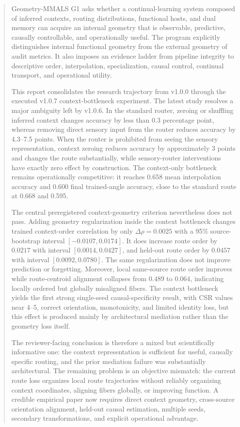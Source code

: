 \documentclass[11pt,a4paper]{article}
\begin{document}
\begin{abstract}
Geometry-MMALS G1 asks whether a continual-learning system composed of inferred contexts, routing distributions, functional hosts, and dual memory can acquire an internal geometry that is observable, predictive, causally controllable, and operationally useful. The program explicitly distinguishes internal functional geometry from the external geometry of audit metrics. It also imposes an evidence ladder from pipeline integrity to descriptive order, interpolation, specialization, causal control, continual transport, and operational utility.

This report consolidates the research trajectory from v1.0.0 through the executed v1.0.7 context-bottleneck experiment. The latest study resolves a major ambiguity left by v1.0.6. In the standard router, zeroing or shuffling inferred context changes accuracy by less than 0.3 percentage point, whereas removing direct sensory input from the router reduces accuracy by 4.3--7.5 points. When the router is prohibited from seeing the sensory representation, context zeroing reduces accuracy by approximately 3 points and changes the route substantially, while sensory-router interventions have exactly zero effect by construction. The context-only bottleneck remains operationally competitive: it reaches 0.658 mean interpolation accuracy and 0.600 final trained-angle accuracy, close to the standard route at 0.668 and 0.595.

The central preregistered context-geometry criterion nevertheless does not pass. Adding geometry regularization inside the context bottleneck changes trained context-order correlation by only $\Delta\rho=0.0025$ with a 95\% source-bootstrap interval $[-0.0107,0.0174]$. It does increase route order by $0.0217$ with interval $[0.0014,0.0427]$, and held-out route order by $0.0457$ with interval $[0.0092,0.0780]$. The same regularization does not improve prediction or forgetting. Moreover, local same-source route order improves while route-centroid alignment collapses from $0.489$ to $0.064$, indicating locally ordered but globally misaligned fibers. The context bottleneck yields the first strong single-seed causal-specificity result, with CSR values near 4--5, correct orientation, monotonicity, and limited identity loss, but this effect is produced mainly by architectural mediation rather than the geometry loss itself.

The reviewer-facing conclusion is therefore a mixed but scientifically informative one: the context representation is sufficient for useful, causally specific routing, and the prior mediation failure was substantially architectural. The remaining problem is an objective mismatch: the current route loss organizes local route trajectories without reliably organizing context coordinates, aligning fibers globally, or improving function. A credible empirical paper now requires direct context geometry, cross-source orientation alignment, held-out causal estimation, multiple seeds, secondary transformations, and explicit operational advantage.
\end{abstract}
\end{document}
